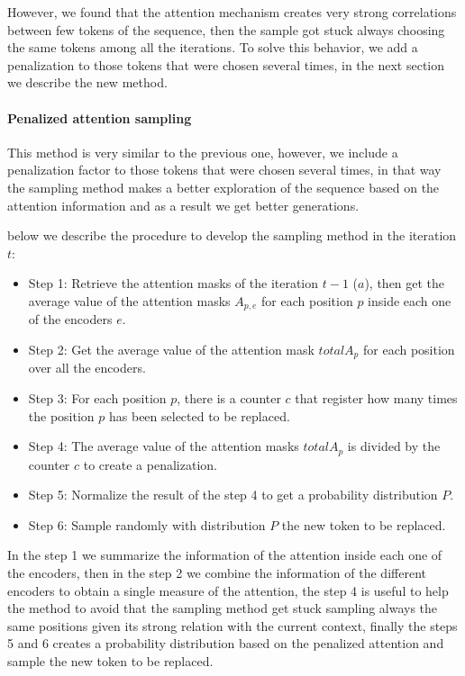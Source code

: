 \documentclass[10pt,twocolumn,letterpaper]{article}
\begin{document}
However, we found that the attention mechanism creates very strong correlations between
few tokens of the sequence, then the sample got stuck always choosing the same tokens among
all the iterations.
To solve this behavior, we add a penalization to those tokens that were
chosen several times, in the next section we describe the new method.

\paragraph{Penalized attention sampling}
This method is very similar to the previous one, however, we include a penalization factor
to those tokens that were chosen several times, in that way the sampling method makes a better
exploration of the sequence based on the attention information and as a result we get better
generations.

below we describe the procedure to develop the sampling method in the iteration $t$:

\begin{itemize}
\item Step 1: Retrieve the attention masks of the iteration $t-1$ ($a$), then get the average value of the attention masks $A_{p,e}$ for each position $p$ inside each one of the encoders $e$.
\item Step 2: Get the average value of the attention mask $totalA_{p}$ for each position over all the encoders.
\item Step 3: For each position $p$, there is a counter $c$ that register how many times the position $p$ has been selected to be replaced.
\item Step 4: The average value of the attention masks $totalA_{p}$ is divided by the counter $c$ to create a penalization.
\item Step 5: Normalize the result of the step 4 to get a probability distribution $P$.
\item Step 6: Sample randomly with distribution $P$ the new token to be replaced.
\end{itemize}

In the step 1 we summarize the information of the attention inside each one of the encoders,
then in the step 2 we combine the information of the different encoders to obtain a single
measure of the attention, the step 4 is useful to help the method to avoid that the sampling
method get stuck sampling always the same positions given its strong relation with the current
context, finally the steps 5 and 6 creates a probability distribution based on the penalized attention
and sample the new token to be replaced.
\end{document}
